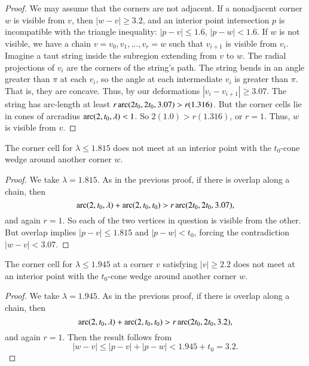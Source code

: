 \begin{proof}
We may assume that the corners are not adjacent. If a nonadjacent
corner $w$ is visible from $v$, then $|w-v|\ge3.2$, and an
interior point intersection $p$ is incompatible with the triangle
inequality: $|p-v|\le 1.6$, $|p-w|<1.6$. If $w$ is not visible, we
have a chain $v=v_0,v_1,\ldots,v_r=w$ such that $v_{i+1}$ is
visible from $v_i$. Imagine a taut string inside the subregion
extending from $v$ to $w$. The radial projections of $v_i$ are the
corners of the string's path.   The string bends in an angle
greater than $\pi$ at each $v_i$, so the angle at each
intermediate $v_i$ is greater than $\pi$. That is, they are
concave. Thus, by our deformations $|v_i-v_{i+1}|\ge3.07$. The
string has arc-length at least $r \operatorname{arc}(2t_0,2t_0,3.07)>r (1.316)$.
But the corner cells lie in cones of arcradius
$\operatorname{arc}(2,t_0,\lambda)< 1$. So $2(1.0)>r(1.316)$, or $r=1$.  Thus,
$w$ is visible from $v$.
\end{proof}

\begin{lemma}
The corner cell for $\lambda \le 1.815$ does not meet at an
interior point with the $t_0$-cone wedge around another corner
$w$.
\end{lemma}

\begin{proof}
We take $\lambda=1.815$. As in the previous proof, if there is overlap
along a chain, then
    $$\operatorname{arc}(2,t_0,\lambda) +\operatorname{arc}(2,t_0,t_0) > r \operatorname{arc}(2t_0,2t_0,3.07),$$
and again $r=1$.  So each of the two vertices in question is visible
from the other. But overlap implies $|p-v|\le1.815$ and $|p-w|<t_0$,
forcing the contradiction $|w-v|<3.07$.
\end{proof}

\begin{lemma}
The corner cell for $\lambda \le 1.945$ at a corner $v$ satisfying
$|v|\ge2.2$ does not meet at an interior point with the $t_0$-cone
wedge around another corner $w$.
\end{lemma}

\begin{proof}
We take $\lambda=1.945$. As in the previous proof, if there is overlap
along a chain, then
    $$\operatorname{arc}(2,t_0,\lambda) +\operatorname{arc}(2,t_0,t_0) > r \operatorname{arc}(2t_0,2t_0,3.2),$$
and again $r=1$.  Then the result follows from
    $$|w-v|\le |p-v|+|p-w| < 1.945 + t_0 = 3.2.$$
\end{proof}




